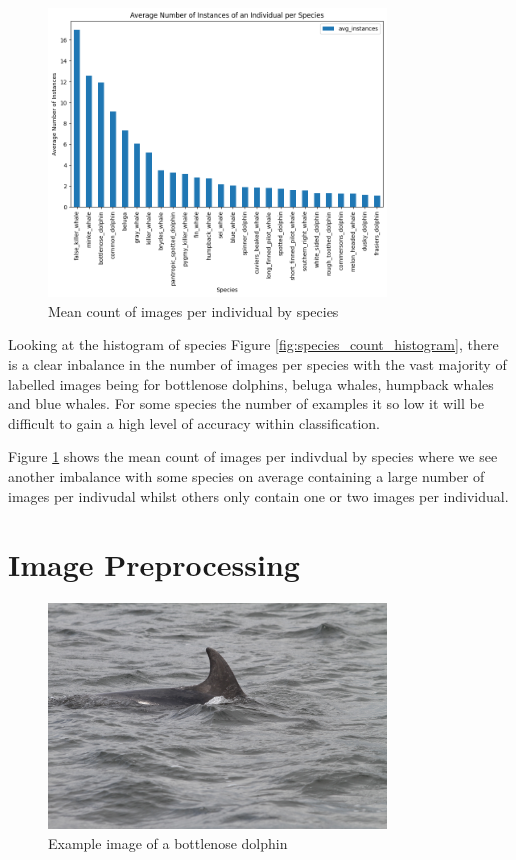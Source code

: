 \documentclass{article}
\begin{document}
\begin{figure}[!htb]
    \centering
    \includegraphics[width=0.8\textwidth]{mean_individuals_histogram.png}
    \caption{Mean count of images per individual by species}
    \label{fig:individual_mean_count_histogram}
\end{figure}

Looking at the histogram of species Figure \ref{fig:species_count_histogram}, there is a clear inbalance in the number of images per species with the vast majority
of labelled images being for bottlenose dolphins, beluga whales, humpback whales and blue whales. For some species the number of examples it so low it will be difficult to gain a high level of accuracy within classification.

Figure \ref{fig:individual_mean_count_histogram} shows the mean count of images per indivdual by species where we see another imbalance with some species on average containing a large number of images per indivudal whilst others only contain one or two images per individual.


\section{Image Preprocessing}

\begin{figure}
    \centering
    \includegraphics[width=0.8\textwidth]{example_train.jpg}
    \caption{Example image of a bottlenose dolphin}
    \label{fig:example_train}
\end{figure}
\end{document}
